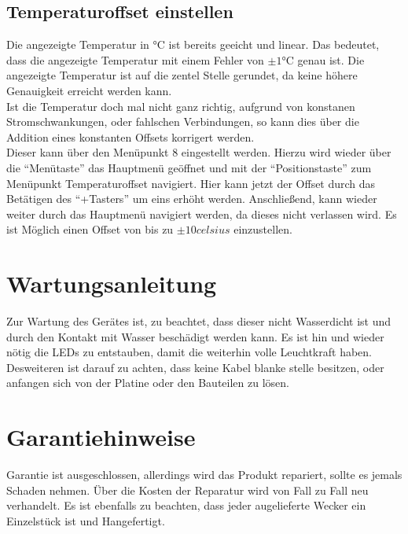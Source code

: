 \documentclass[12pt,a4paper,titlepage,headinclude]{scrartcl}
\numberwithin{equation}{subsection}
\begin{document}
\subsection{Temperaturoffset einstellen}
Die angezeigte Temperatur in \si{\celsius} ist bereits geeicht und linear.
Das bedeutet, dass die angezeigte Temperatur mit einem Fehler von $\pm1\si{\celsius}$ genau ist.
Die angezeigte Temperatur ist auf die zentel Stelle gerundet, da keine höhere Genauigkeit erreicht werden kann.\\
Ist die Temperatur doch mal nicht ganz richtig, aufgrund von konstanen Stromschwankungen, oder fahlschen Verbindungen, so kann dies über die Addition eines konstanten Offsets korrigert werden.\\
Dieser kann über den Menüpunkt 8 eingestellt werden.
Hierzu wird wieder über die "`Menütaste"' das Hauptmenü geöffnet und mit der "`Positionstaste"' zum Menüpunkt Temperaturoffset navigiert.
Hier kann jetzt der Offset durch das Betätigen des "`+Tasters"' um eins erhöht werden.
Anschließend, kann wieder weiter durch das Hauptmenü navigiert werden, da dieses nicht verlassen wird.
Es ist Möglich einen Offset von bis zu $\pm10\si{celsius}$ einzustellen.


\section{Wartungsanleitung}
\label{sec:wartungsanleitung}
Zur Wartung des Gerätes ist, zu beachtet, dass dieser nicht Wasserdicht ist und durch den Kontakt mit Wasser beschädigt werden kann.
Es ist hin und wieder nötig die LEDs zu entstauben, damit die weiterhin volle Leuchtkraft haben.
Desweiteren ist darauf zu achten, dass keine Kabel blanke stelle besitzen, oder anfangen sich von der Platine oder den Bauteilen zu lösen.

\section{Garantiehinweise}
\label{sec:Garantiehinweise}
Garantie ist ausgeschlossen, allerdings wird das Produkt repariert, sollte es jemals Schaden nehmen.
Über die Kosten der Reparatur wird von Fall zu Fall neu verhandelt.
Es ist ebenfalls zu beachten, dass jeder augelieferte Wecker ein Einzelstück ist und Hangefertigt.

\newpage
\printbibliography[heading=bibintoc]
\end{document}
